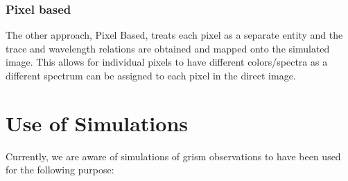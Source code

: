 \documentclass[preprint]{aastex}
\begin{document}
\subsubsection{Pixel based}

The other approach, Pixel Based, treats each pixel as a separate entity and the trace and wavelength relations are obtained and mapped onto the simulated image. This allows for individual pixels to have different colors/spectra as a different spectrum can be assigned to each pixel in the direct image. 

\section{Use of Simulations}
Currently, we are aware of simulations of grism observations to have been used for the following purpose:
\end{document}
